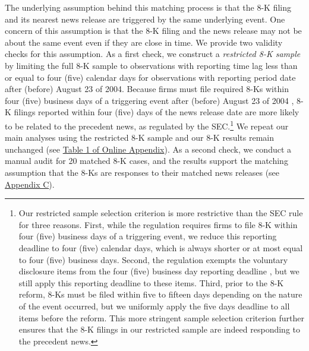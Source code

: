 \documentclass[letterpaper,12pt]{article}
\begin{document}
\begin{spacing}{1.5}
The underlying assumption behind this matching process is that the 8-K filing and its nearest news release are triggered by the same underlying event. One concern of this assumption is that the 8-K filing and the news release may not be about the same event even if they are close in time. We provide two validity checks for this assumption. As a first check, we construct a \textit{restricted 8-K sample} by limiting the full 8-K sample to observations with reporting time lag less than or equal to four (five) calendar days for observations with reporting period date after (before) August 23 of 2004. Because firms must file required 8-Ks within four (five) business days of a triggering event after (before) August 23 of 2004 \cite{secFinalRuleAdditional2004}, 8-K filings reported within four (five) days of the news release date are more likely to be related to the precedent news, as regulated by the SEC.\footnote{Our restricted sample selection criterion is more restrictive than the SEC rule for three reasons. First, while the regulation requires firms to file 8-K within four (five) business days of a triggering event, we reduce this reporting deadline to four (five) calendar days, which is always shorter or at most equal to four (five) business days. Second, the regulation exempts the voluntary disclosure items from the four (five) business day reporting deadline \cite{heMeasuringDisclosureUsing2020}, but we still apply this reporting deadline to these items. Third, prior to the 8-K reform, 8-Ks must be filed within five to fifteen days depending on the nature of the event occurred, but we uniformly apply the five days deadline to all items before the reform. This more stringent sample selection criterion further ensures that the 8-K filings in our restricted sample are indeed responding to the precedent news.} We repeat our main analyses using the restricted 8-K sample and our 8-K results remain unchanged (see \hyperref[oat1]{Table 1 of Online Appendix}). As a second check, we conduct a manual audit for 20 matched 8-K cases, and the results support the matching assumption that the 8-Ks are responses to their matched news releases (see \hyperref[appc]{Appendix C}).


\end{spacing}
\end{document}
